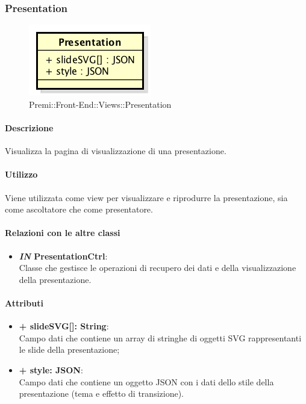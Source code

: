 	
\subsubsection{Presentation}
	\begin{figure}[h]
		\centering
		\includegraphics[width=0.3\linewidth]{img/premi_front_end_views_presentation}
		\caption[Premi::Front-End::Views::Presentation]{Premi::Front-End::Views::Presentation}
	\end{figure}
	
	\paragraph{Descrizione}
	Visualizza la pagina di visualizzazione di una presentazione.
	
	\paragraph{Utilizzo}
	Viene utilizzata come view per visualizzare e riprodurre la presentazione, sia come ascoltatore che come presentatore.
	
	\paragraph{Relazioni con le altre classi}
	\begin{itemize}
		\item \textbf{\textit{IN} PresentationCtrl}:\\
			Classe che gestisce le operazioni di recupero dei dati e della visualizzazione della presentazione.
	\end{itemize}
	
	\paragraph{Attributi}
	\begin{itemize}
		\item \textbf{+ slideSVG[]: String}:\\
		Campo dati che contiene un array di stringhe di oggetti SVG rappresentanti le \gls{slide} della presentazione;
		\item \textbf{+ style: JSON}: \\
		Campo dati che contiene un oggetto \gls{JSON} con i dati dello stile della presentazione (tema e effetto di transizione).
	\end{itemize}
\newpage
	
